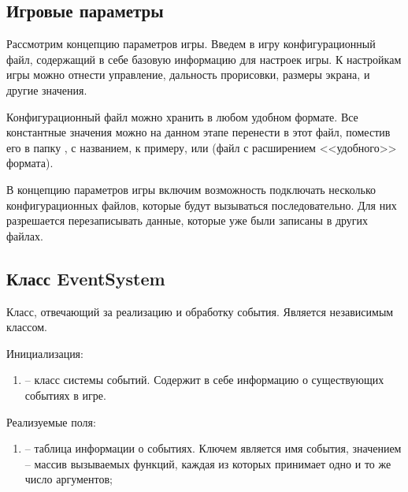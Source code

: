 \subsection{Игровые параметры}
	
	Рассмотрим концепцию параметров игры. Введем в игру конфигурационный файл, содержащий в себе базовую информацию для настроек игры. К настройкам игры можно отнести управление, дальность прорисовки, размеры экрана, и другие значения. 

	Конфигурационный файл можно хранить в любом удобном формате. Все константные значения можно на данном этапе перенести в этот файл, поместив его в папку , с названием, к примеру,  или  (файл с расширением <<удобного>> формата).

	В концепцию параметров игры включим возможность подключать несколько конфигурационных файлов, которые будут вызываться последовательно. Для них разрешается перезаписывать данные, которые уже были записаны в других файлах.
	

\subsection{Класс EventSystem}
	
	\noindent Класс, отвечающий за реализацию и обработку события. Является независимым классом.

	\noindent Инициализация:
	\begin{enumerate}
		\item {} -- класс системы событий. Содержит в себе информацию о существующих событиях в игре.
	\end{enumerate}

	\noindent Реализуемые поля:
	\begin{enumerate}
		\item {} -- таблица информации о событиях. Ключем является имя события, значением -- массив вызываемых функций, каждая из которых принимает одно и то же число аргументов;
	\end{enumerate}

